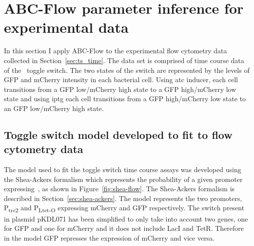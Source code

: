 %

\section{ABC-Flow parameter inference for experimental data}
 
In this section I apply ABC-Flow to the experimental flow cytometry data collected in Section~\ref{sec:ts_time}. The data set is comprised of time course data of the~\textcite{Litcofsky:2012gr} toggle switch. The two states of the switch are represented by the levels of GFP and mCherry intensity in each bacterial cell. Using \acrshort{atc} inducer, each cell transitions from a GFP low/mCherry high state to a GFP high/mCherry low state and using \acrshort{iptg} each cell transitions from a GFP high/mCherry low state to an GFP low/mCherry high state. 


\subsection{Toggle switch model developed to fit to flow cytometry data}
\label{sec:Real_model}
The model used to fit the toggle switch time course assays was developed using the Shea-Ackers formalism which represents the probability of a given promoter expressing~\autocite{Ackers:1982tq}, as shown in Figure~\ref{fig:shea-flow}. The Shea-Ackers formalism is described in Section~\ref{sec:shea-ackers}. The model represents the two promoters, P\textsubscript{trc2} and P\textsubscript{Ltet-O} expressing mCherry and GFP respectively. The switch present in plasmid pKDL071 has been simplified to only take into account two genes, one for GFP and one for mCherry and it does not include LacI and TetR. Therefore in the model GFP represses the expression of mCherry and vice versa. 


